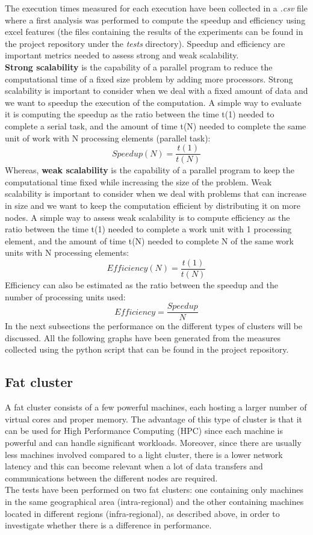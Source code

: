 \documentclass[final,5p,times,twocolumn,authoryear]{elsarticle}
\begin{document}
The execution times measured for each execution have been collected in a \emph{.csv} file where a first analysis was performed to compute the speedup and efficiency using excel features (the files containing the results of the experiments can be found in the project repository under the \emph{tests} directory\cite{tests me}). Speedup and efficiency are important metrics needed to assess strong and weak scalability. \\
\textbf{Strong scalability} is the capability of a parallel program to reduce the computational time of a fixed size problem by adding more processors. Strong scalability is important to consider when we deal with a fixed amount of data and we want to speedup the execution of the computation. A simple way to evaluate it is computing the speedup as the ratio between the time t(1) needed to complete a serial task, and the amount of time t(N) needed to complete the same unit of work with N processing elements (parallel task)\cite{hpc scaling}:
$$ Speedup(N) = \frac{t(1)}{t(N)} $$
Whereas, \textbf{weak scalability} is the capability of a parallel program to keep the computational time fixed while increasing the size of the problem. Weak scalability is important to consider when we deal with problems that can increase in size and we want to keep the computation efficient by distributing it on more nodes. A simple way to assess weak scalability is to compute efficiency as the ratio between the time t(1) needed to complete a work unit with 1 processing element, and the amount of time t(N) needed to complete N of the same work units with N processing elements\cite{hpc scaling}:
$$ Efficiency(N) = \frac{t(1)}{t(N)} $$
Efficiency can also be estimated as the ratio between the speedup and the number of processing units used:
$$ Efficiency = \frac{Speedup}{N} $$
In the next subsections the performance on the different types of clusters will be discussed. All the following graphs have been generated from the measures collected using the python script that can be found in the project repository\cite{analysis me}.

\subsection{Fat cluster}
A fat cluster consists of a few powerful machines, each hosting a larger number of virtual cores and proper memory. The advantage of this type of cluster is that it can be used for High Performance Computing (HPC) since each machine is powerful and can handle significant workloads. Moreover, since there are usually less machines involved compared to a light cluster, there is a lower network latency and this can become relevant when a lot of data transfers and communications between the different nodes are required.\\
The tests have been performed on two fat clusters: one containing only machines in the same geographical area (intra-regional) and the other containing machines located in different regions (infra-regional), as described above, in order to investigate whether there is a difference in performance.
\end{document}
